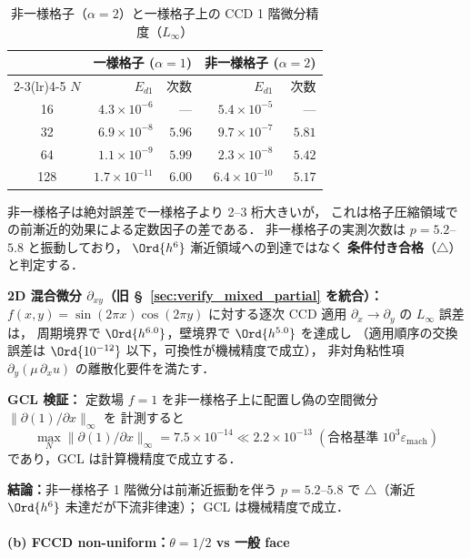 \begin{table}[htbp]
\centering
\caption{非一様格子（$\alpha = 2$）と一様格子上の CCD 1 階微分精度（$L_\infty$）}
\label{tab:gcl_convergence}
\renewcommand{\arraystretch}{1.2}
\footnotesize
\begin{tabular}{c rr rr}
\toprule
& \multicolumn{2}{c}{一様格子 ($\alpha=1$)}
& \multicolumn{2}{c}{非一様格子 ($\alpha=2$)} \\
\cmidrule(lr){2-3}\cmidrule(lr){4-5}
$N$ & $E_{d1}$ & 次数 & $E_{d1}$ & 次数 \\
\midrule
 16 & $4.3 \times 10^{-6}$  & ---   & $5.4 \times 10^{-5}$  & ---   \\
 32 & $6.9 \times 10^{-8}$  & $5.96$& $9.7 \times 10^{-7}$  & $5.81$\\
 64 & $1.1 \times 10^{-9}$  & $5.99$& $2.3 \times 10^{-8}$  & $5.42$\\
128 & $1.7 \times 10^{-11}$ & $6.00$& $6.4 \times 10^{-10}$ & $5.17$\\
\bottomrule
\end{tabular}
\end{table}

非一様格子は絶対誤差で一様格子より 2--3 桁大きいが，
これは格子圧縮領域での前漸近的効果による定数因子の差である．
非一様格子の実測次数は $p = 5.2$--$5.8$ と振動しており，
$\Ord{h^6}$ 漸近領域への到達ではなく
\textbf{条件付き合格}（$\triangle$）と判定する．

\medskip
\noindent\textbf{2D 混合微分 $\partial_{xy}$（旧 §~\ref{sec:verify_mixed_partial} を統合）：}
\label{sec:verify_mixed_partial}
$f(x, y) = \sin(2\pi x)\cos(2\pi y)$ に対する逐次 CCD 適用
$\partial_x \to \partial_y$ の $L_\infty$ 誤差は，
周期境界で $\Ord{h^{6.0}}$，壁境界で $\Ord{h^{5.0}}$ を達成し
（適用順序の交換誤差は $\Ord{10^{-12}}$ 以下，可換性が機械精度で成立），
非対角粘性項 $\partial_y(\mu\,\partial_x u)$ の離散化要件を満たす．

\medskip
\noindent\textbf{GCL 検証：}
定数場 $f = 1$ を非一様格子上に配置し偽の空間微分 $\|\partial(1)/\partial x\|_\infty$ を
計測すると
\[
  \max_N \|\partial(1)/\partial x\|_\infty = 7.5 \times 10^{-14}
  \ll 2.2 \times 10^{-13}\;(\text{合格基準 } 10^3 \varepsilon_\mathrm{mach})
\]
であり，GCL は計算機精度で成立する．

\noindent\textbf{結論：}非一様格子 1 階微分は前漸近振動を伴う $p = 5.2$--$5.8$ で
$\triangle$（漸近 $\Ord{h^6}$ 未達だが下流非律速）；
GCL は機械精度で成立．

\paragraph{(b) FCCD non-uniform：$\theta = 1/2$ vs 一般 face}
\label{sec:U3_fccd_nonuniform}

